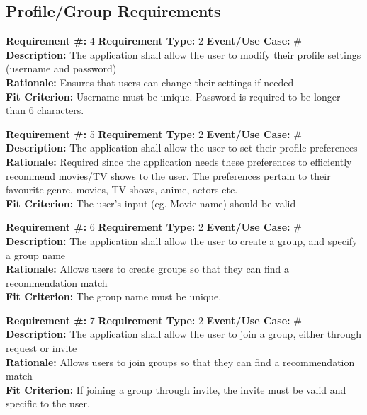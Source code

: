 \documentclass[12pt]{article}
\begin{document}
\subsection{Profile/Group Requirements} 
\noindent

\textbf{Requirement \#:} 4 \quad \textbf{Requirement Type:} 2 \quad \textbf{Event/Use Case:} \#
\medskip
\\\textbf{Description:} The application shall allow the user to modify their profile settings (username and password)
\\\textbf{Rationale:} Ensures that users can change their settings if needed
\\\textbf{Fit Criterion:} Username must be unique. Password is required to be longer than 6 characters.

\bigskip
\textbf{Requirement \#:} 5 \quad \textbf{Requirement Type:} 2 \quad \textbf{Event/Use Case:} \#
\medskip
\\\textbf{Description:} The application shall allow the user to set their profile preferences 
\\\textbf{Rationale:} Required since the application needs these preferences to efficiently recommend movies/TV shows to the user. The preferences pertain to their favourite genre, movies, TV shows, anime, actors etc.
\\\textbf{Fit Criterion:} The user's input (eg. Movie name) should be valid

\bigskip
\textbf{Requirement \#:} 6 \quad \textbf{Requirement Type:} 2 \quad \textbf{Event/Use Case:} \#
\medskip
\\\textbf{Description:} The application shall allow the user to create a group, and specify a group name
\\\textbf{Rationale:} Allows users to create groups so that they can find a recommendation match
\\\textbf{Fit Criterion:} The group name must be unique.

\bigskip
\textbf{Requirement \#:} 7 \quad \textbf{Requirement Type:} 2 \quad \textbf{Event/Use Case:} \#
\medskip
\\\textbf{Description:} The application shall allow the user to join a group, either through request or invite
\\\textbf{Rationale:} Allows users to join groups so that they can find a recommendation match
\\\textbf{Fit Criterion:} If joining a group through invite, the invite must be valid and specific to the user.
\end{document}
